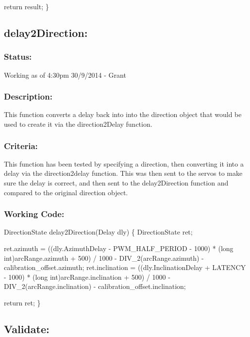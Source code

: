 \documentclass[]{article}
\begin{document}
	return result;\newline
\}\newline

\subsection{delay2Direction:}
\subsubsection{Status:}
Working as of 4:30pm 30/9/2014 - Grant

\subsubsection{Description:}
This function converts a delay back into into the direction object that would be used to create it via the direction2Delay function.

\subsubsection{Criteria:}
This function has been tested by specifying a direction, then converting it into a delay via the direction2delay function. This was then sent to the servos to make sure the delay is correct, and then sent to the delay2Direction function and compared to the original direction object.

\subsubsection{Working Code:}
DirectionState delay2Direction(Delay dly) \newline
\{ \newline
	DirectionState ret; \newline
	
	ret.azimuth = ((dly.AzimuthDelay - PWM\_HALF\_PERIOD - 1000) * (long int)arcRange.azimuth + 500) / 1000 - DIV\_2(arcRange.azimuth) - calibration\_offset.azimuth; \newline
	ret.inclination = ((dly.InclinationDelay + LATENCY - 1000) * (long int)arcRange.inclination + 500) / 1000 - DIV\_2(arcRange.inclination) - calibration\_offset.inclination; \newline
	
	return ret; \newline
\} \newline

\subsection{Validate:}
\end{document}

